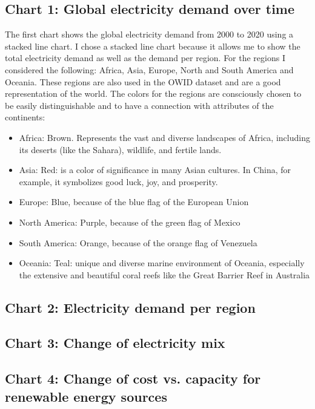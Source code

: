 \documentclass{article}
\begin{document}
\subsection{Chart 1: Global electricity demand over time}

The first chart shows the global electricity demand from 2000 to 2020 using a stacked line chart.
I chose a stacked line chart because it allows me to show the total electricity demand as well as the demand per region.
For the regions I considered the following: Africa, Asia, Europe, North and South America and Oceania.
These regions are also used in the OWID dataset and are a good representation of the world.
The colors for the regions are consciously chosen to be easily distinguishable and to have a connection with attributes of the continents:
\begin{itemize}
    \item Africa: Brown. Represents the vast and diverse landscapes of Africa, including its deserts (like the Sahara), wildlife, and fertile lands.
    \item Asia: Red: is a color of significance in many Asian cultures. In China, for example, it symbolizes good luck, joy, and prosperity.
    \item Europe: Blue, because of the blue flag of the European Union
    \item North America: Purple, because of the green flag of Mexico
    \item South America: Orange, because of the orange flag of Venezuela
    \item Oceania: Teal: unique and diverse marine environment of Oceania, especially the extensive and beautiful coral reefs like the Great Barrier Reef in Australia
\end{itemize}


\subsection{Chart 2: Electricity demand per region}
\subsection{Chart 3: Change of electricity mix}
\subsection{Chart 4: Change of cost vs. capacity for renewable energy sources}

\newpage
\end{document}
